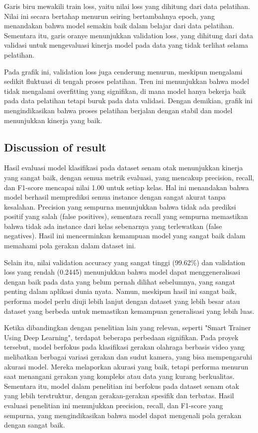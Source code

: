 \documentclass[12pt,a4paper]{article}
\begin{document}
Garis biru mewakili train loss, yaitu nilai loss yang dihitung dari data pelatihan. Nilai ini secara bertahap menurun seiring bertambahnya epoch, yang menandakan bahwa model semakin baik dalam belajar dari data pelatihan. Sementara itu, garis oranye menunjukkan validation loss, yang dihitung dari data validasi untuk mengevaluasi kinerja model pada data yang tidak terlihat selama pelatihan.

Pada grafik ini, validation loss juga cenderung menurun, meskipun mengalami sedikit fluktuasi di tengah proses pelatihan. Tren ini menunjukkan bahwa model tidak mengalami overfitting yang signifikan, di mana model hanya bekerja baik pada data pelatihan tetapi buruk pada data validasi. Dengan demikian, grafik ini mengindikasikan bahwa proses pelatihan berjalan dengan stabil dan model menunjukkan kinerja yang baik.

\subsection{Discussion of result}
Hasil evaluasi model klasifikasi pada dataset senam otak menunjukkan kinerja yang sangat baik, dengan semua metrik evaluasi, yang mencakup precision, recall, dan F1-score mencapai nilai 1.00 untuk setiap kelas. Hal ini menandakan bahwa model berhasil memprediksi semua instance dengan sangat akurat tanpa kesalahan. Precision yang sempurna menunjukkan bahwa tidak ada prediksi positif yang salah (false positives), sementara recall yang sempurna memastikan bahwa tidak ada instance dari kelas sebenarnya yang terlewatkan (false negatives). Hasil ini mencerminkan kemampuan model yang sangat baik dalam memahami pola gerakan dalam dataset ini.

Selain itu, nilai validation accuracy yang sangat tinggi (99.62\%) dan validation loss yang rendah (0.2445) menunjukkan bahwa model dapat menggeneralisasi dengan baik pada data yang belum pernah dilihat sebelumnya, yang sangat penting dalam aplikasi dunia nyata. Namun, meskipun hasil ini sangat baik, performa model perlu diuji lebih lanjut dengan dataset yang lebih besar atau dataset yang berbeda untuk memastikan kemampuan generalisasi yang lebih luas.

Ketika dibandingkan dengan penelitian lain yang relevan, seperti "Smart Trainer Using Deep Learning", terdapat beberapa perbedaan signifikan. Pada proyek tersebut, model berfokus pada klasifikasi gerakan olahraga berbasis video yang melibatkan berbagai variasi gerakan dan sudut kamera, yang bisa mempengaruhi akurasi model. Mereka melaporkan akurasi yang baik, tetapi performa menurun saat menangani gerakan yang kompleks atau data yang kurang berkualitas. Sementara itu, model dalam penelitian ini berfokus pada dataset senam otak yang lebih terstruktur, dengan gerakan-gerakan spesifik dan terbatas. Hasil evaluasi penelitian ini menunjukkan precision, recall, dan F1-score yang sempurna, yang mengindikasikan bahwa model dapat mengenali pola gerakan dengan sangat baik.
\end{document}
